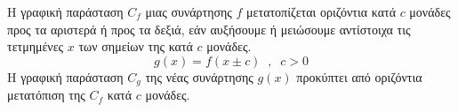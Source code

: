 Η γραφική παράσταση $ C_f $ μιας συνάρτησης $ f $ μετατοπίζεται οριζόντια κατά $ c $ μονάδες προς τα αριστερά ή προς τα δεξιά, εάν αυξήσουμε ή μειώσουμε αντίστοιχα τις τετμημένες $ x $ των σημείων της κατά $ c $ μονάδες.
\[ g(x)=f(x\pm c)\;\;,\;\;c>0  \]
Η γραφική παράσταση $ C_g $ της νέας συνάρτησης $ g(x) $ προκύπτει από οριζόντια μετατόπιση της $ C_f $ κατά $ c $ μονάδες.